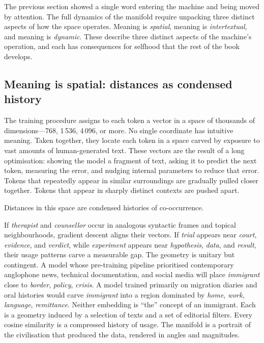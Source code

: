 The previous section showed a single word entering the machine and being moved by attention. The full dynamics of the manifold require unpacking three distinct aspects of how the space operates. Meaning is \emph{spatial}, meaning is \emph{intertextual}, and meaning is \emph{dynamic}. These describe three distinct aspects of the machine's operation, and each has consequences for selfhood that the rest of the book develops.

\subsection{Meaning is spatial: distances as condensed history}

The training procedure assigns to each token a vector in a space of thousands of dimensions---768, 1\,536, 4\,096, or more. No single coordinate has intuitive meaning. Taken together, they locate each token in a space carved by exposure to vast amounts of human-generated text. These vectors are the result of a long optimisation: showing the model a fragment of text, asking it to predict the next token, measuring the error, and nudging internal parameters to reduce that error. Tokens that repeatedly appear in similar surroundings are gradually pulled closer together. Tokens that appear in sharply distinct contexts are pushed apart.

Distances in this space are condensed histories of co-occurrence.

If \emph{therapist} and \emph{counsellor} occur in analogous syntactic frames and topical neighbourhoods, gradient descent aligns their vectors. If \emph{trial} appears near \emph{court}, \emph{evidence}, and \emph{verdict}, while \emph{experiment} appears near \emph{hypothesis}, \emph{data}, and \emph{result}, their usage patterns carve a measurable gap. The geometry is unitary but contingent. A model whose pre-training pipeline prioritised contemporary anglophone news, technical documentation, and social media will place \emph{immigrant} close to \emph{border}, \emph{policy}, \emph{crisis}. A model trained primarily on migration diaries and oral histories would carve \emph{immigrant} into a region dominated by \emph{home}, \emph{work}, \emph{language}, \emph{remittance}. Neither embedding is ``the'' concept of an immigrant. Each is a geometry induced by a selection of texts and a set of editorial filters. Every cosine similarity is a compressed history of usage. The manifold is a portrait of the civilisation that produced the data, rendered in angles and magnitudes.

